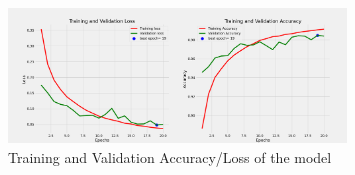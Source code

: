 \begin{figure}[H]
    \centering
    \includegraphics[width= 0.8\textwidth]{assets/fine-tuning/FT_base_256d.png} 
    \caption{Training and Validation Accuracy/Loss of the model} 
    \label{fig:immagine}
\end{figure}